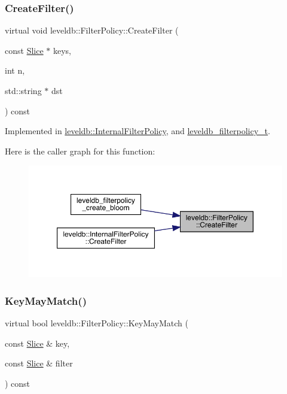 \subsubsection{\texorpdfstring{CreateFilter()}{CreateFilter()}}
{\footnotesize\ttfamily virtual void leveldb\+::\+Filter\+Policy\+::\+Create\+Filter (\begin{DoxyParamCaption}\item[{const \mbox{\hyperlink{classleveldb_1_1_slice}{Slice}} $\ast$}]{keys,  }\item[{int}]{n,  }\item[{std\+::string $\ast$}]{dst }\end{DoxyParamCaption}) const\hspace{0.3cm}{\ttfamily [pure virtual]}}



Implemented in \mbox{\hyperlink{classleveldb_1_1_internal_filter_policy_a0ed8ebb6899c13f90853f61d0e69fbaf}{leveldb\+::\+Internal\+Filter\+Policy}}, and \mbox{\hyperlink{structleveldb__filterpolicy__t_aa833af852917381cd8db4c8ec21a3762}{leveldb\+\_\+filterpolicy\+\_\+t}}.

Here is the caller graph for this function\+:
\nopagebreak
\begin{figure}[H]
\begin{center}
\leavevmode
\includegraphics[width=350pt]{classleveldb_1_1_filter_policy_a355e9797e16dd16b93d19056781126b2_icgraph}
\end{center}
\end{figure}
\mbox{\label{classleveldb_1_1_filter_policy_a6f8ba10ea25e0b4b8d0a6607c361c718}} 
\subsubsection{\texorpdfstring{KeyMayMatch()}{KeyMayMatch()}}
{\footnotesize\ttfamily virtual bool leveldb\+::\+Filter\+Policy\+::\+Key\+May\+Match (\begin{DoxyParamCaption}\item[{const \mbox{\hyperlink{classleveldb_1_1_slice}{Slice}} \&}]{key,  }\item[{const \mbox{\hyperlink{classleveldb_1_1_slice}{Slice}} \&}]{filter }\end{DoxyParamCaption}) const\hspace{0.3cm}{\ttfamily [pure virtual]}}



